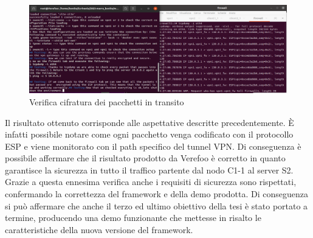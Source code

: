 \begin{figure}[H] 
    \centering
    \includegraphics[width=1\textwidth]{(4)Encryptedpacket_output.png} 
    \caption{Verifica cifratura dei pacchetti in transito}
    \label{fig:Verifica4}
\end{figure}

Il risultato ottenuto corrisponde alle aspettative descritte precedentemente. È infatti possibile notare come ogni pacchetto venga codificato con il protocollo ESP e viene monitorato con il path specifico del tunnel VPN.
Di conseguenza è possibile affermare che il risultato prodotto da Verefoo è corretto in quanto garantisce la sicurezza in tutto il traffico partente dal nodo C1-1 al server S2. Grazie a questa ennesima verifica anche i requisiti
di sicurezza sono rispettati, confermando la correttezza del framework e della demo prodotta. Di conseguenza si può affermare che anche il terzo ed ultimo obiettivo della tesi è stato portato a termine, producendo una demo funzionante che
mettesse in risalto le caratteristiche della nuova versione del framework.

